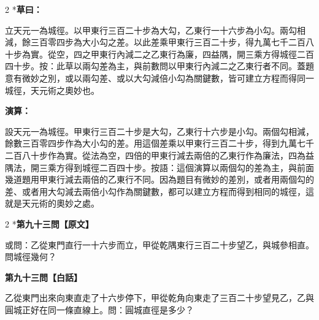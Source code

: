 \documentclass[11pt,a4paper]{article}
\begin{document}
\begin{paracol}{2}
\switchcolumn[0]*\textbf{草曰：}

\small 立天元一為城徑。以甲東行三百二十步為大勾，乙東行一十六步為小勾。兩勾相減，餘三百零四步為大小勾之差。以此差乘甲東行三百二十步，得九萬七千二百八十步為實。從空，四之甲東行內減二之乙東行為廉，四益隅，開三乘方得城徑二百四十步。按：此草以兩勾差為主，與前數問以甲東行內減二之乙東行者不同。蓋題意有微妙之別，或以兩勾差、或以大勾減倍小勾為關鍵數，皆可建立方程而得同一城徑，天元術之奧妙也。

\switchcolumn\textbf{演算：}

\small 設天元一為城徑。甲東行三百二十步是大勾，乙東行十六步是小勾。兩個勾相減，餘數三百零四步作為大小勾的差。用這個差乘以甲東行三百二十步，得到九萬七千二百八十步作為實。從法為空，四倍的甲東行減去兩倍的乙東行作為廉法，四為益隅法，開三乘方得到城徑二百四十步。按語：這個演算以兩個勾的差為主，與前面幾道題用甲東行減去兩倍的乙東行不同。因為題目有微妙的差別，或者用兩個勾的差、或者用大勾減去兩倍小勾作為關鍵數，都可以建立方程而得到相同的城徑，這就是天元術的奧妙之處。
\end{paracol}

\vspace{0.1cm}
\noindent{}
\par\vspace{0.3cm}

\begin{paracol}{2}
\switchcolumn[0]*\noindent\textbf{第九十三問【原文】}

\small 或問：乙從東門直行一十六步而立，甲從乾隅東行三百二十步望乙，與城參相直。問城徑幾何？

\switchcolumn\noindent\textbf{第九十三問【白話】}

\small 乙從東門出來向東直走了十六步停下，甲從乾角向東走了三百二十步望見乙，乙與圓城正好在同一條直線上。問：圓城直徑是多少？
\end{paracol}

\vspace{0.1cm}
\noindent{}
\par\vspace{0.15cm}
\end{document}
